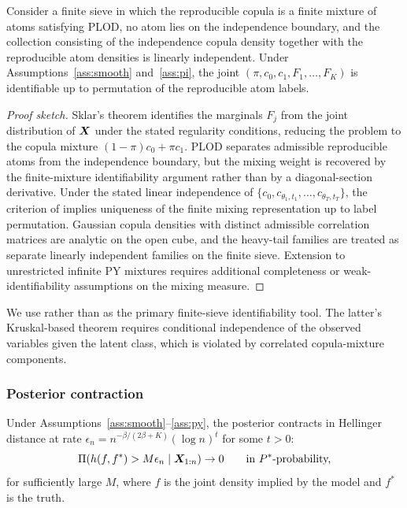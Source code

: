 \begin{theorem}
\label{thm:id}
Consider a finite sieve in which the reproducible copula is a finite mixture of atoms satisfying PLOD, no atom lies on the independence boundary, and the collection consisting of the independence copula density together with the reproducible atom densities is linearly independent. Under Assumptions~\ref{ass:smooth} and~\ref{ass:pi}, the joint $(\pi,c_0,c_1,F_1,\ldots,F_K)$ is identifiable up to permutation of the reproducible atom labels.
\end{theorem}

\begin{proof}[Proof sketch]
Sklar's theorem \citep{Sklar1959} identifies the marginals $F_j$ from the joint distribution of $\bm{X}$ under the stated regularity conditions, reducing the problem to the copula mixture $(1-\pi)c_0+\pi c_1$. PLOD separates admissible reproducible atoms from the independence boundary, but the mixing weight is recovered by the finite-mixture identifiability argument rather than by a diagonal-section derivative. Under the stated linear independence of $\{c_0,c_{\theta_1,t_1},\ldots,c_{\theta_T,t_T}\}$, the criterion of \citet{YakowitzSpragins1968} implies uniqueness of the finite mixing representation up to label permutation. Gaussian copula densities with distinct admissible correlation matrices are analytic on the open cube, and the heavy-tail families are treated as separate linearly independent families on the finite sieve. Extension to unrestricted infinite PY mixtures requires additional completeness or weak-identifiability assumptions on the mixing measure.
\end{proof}

\begin{remark}
\label{rem:amr-vs-yakowitz}
We use \citet{YakowitzSpragins1968} rather than \citet{AllmanMatiasRhodes2009} as the primary finite-sieve identifiability tool. The latter's Kruskal-based theorem requires conditional independence of the observed variables given the latent class, which is violated by correlated copula-mixture components.
\end{remark}

\subsubsection{Posterior contraction}

\begin{theorem}
\label{thm:contract}
Under Assumptions~\ref{ass:smooth}--\ref{ass:py}, the posterior contracts in Hellinger distance at rate $\epsilon_n=n^{-\beta/(2\beta+K)}(\log n)^t$ for some $t>0$:
\[
\Pi\!\left(h(f,f^*)>M\epsilon_n\mid\bm{X}_{1:n}\right)\to0\qquad\text{in }P^*\text{-probability,}
\]
for sufficiently large $M$, where $f$ is the joint density implied by the model and $f^*$ is the truth.
\end{theorem}

